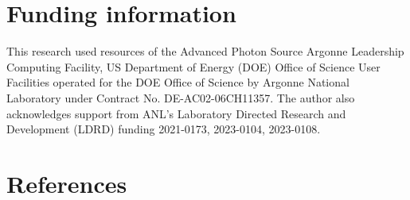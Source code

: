 \documentclass{article}
\begin{document}
\section*{Funding information}

This research used resources of the Advanced Photon Source Argonne Leadership Computing Facility, US Department of Energy (DOE) Office of Science User Facilities operated for the DOE Office of Science by Argonne National Laboratory under Contract No. DE-AC02-06CH11357. The author also acknowledges support from ANL’s Laboratory Directed Research and Development (LDRD) funding 2021-0173, 2023-0104, 2023-0108.

\section*{References}
\end{document}
